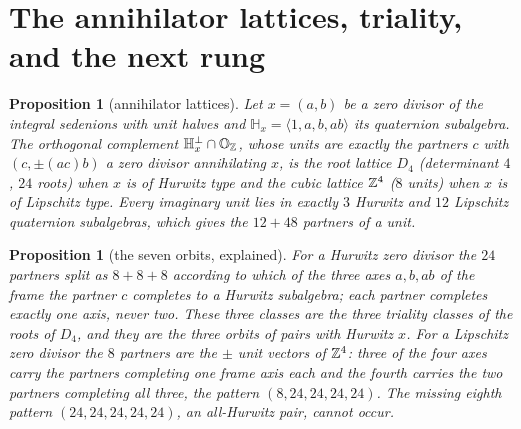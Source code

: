 \documentclass[11pt]{amsart}
\newtheorem{proposition}[theorem]{Proposition}
\theoremstyle{definition}
\begin{document}
\section{The annihilator lattices, triality, and the next rung}\label{sec:nextrung}
\begin{proposition}[annihilator lattices]\label{prop:annlat}
Let $x=(a,b)$ be a zero divisor of the integral sedenions with unit halves and $\mathbb H_x=\langle 1,a,b,ab\rangle$ its quaternion subalgebra. The orthogonal complement $\mathbb H_x^\perp\cap\mathbb O_{\mathbb{Z}}$, whose units are exactly the partners $c$ with $(c,\pm(ac)b)$ a zero divisor annihilating $x$, is the root lattice $D_4$ (determinant $4$, $24$ roots) when $x$ is of Hurwitz type and the cubic lattice $\mathbb{Z}^4$ ($8$ units) when $x$ is of Lipschitz type. Every imaginary unit lies in exactly $3$ Hurwitz and $12$ Lipschitz quaternion subalgebras, which gives the $12+48$ partners of a unit.
\end{proposition}
\begin{proposition}[the seven orbits, explained]\label{prop:seven-explained}
For a Hurwitz zero divisor the $24$ partners split as $8+8+8$ according to which of the three axes $a,b,ab$ of the frame the partner $c$ completes to a Hurwitz subalgebra; each partner completes exactly one axis, never two. These three classes are the three triality classes of the roots of $D_4$, and they are the three orbits of pairs with Hurwitz $x$. For a Lipschitz zero divisor the $8$ partners are the $\pm$ unit vectors of $\mathbb{Z}^4$: three of the four axes carry the partners completing one frame axis each and the fourth carries the two partners completing all three, the pattern $(8,24,24,24,24)$. The missing eighth pattern $(24,24,24,24,24)$, an all-Hurwitz pair, cannot occur.
\end{proposition}
\end{document}
